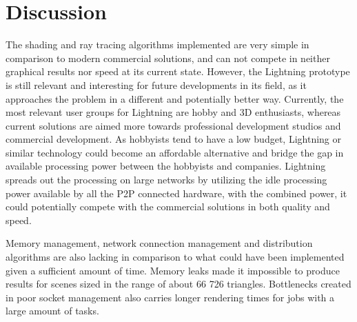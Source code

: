 \section{Discussion}



The shading and ray tracing algorithms implemented are very simple in
comparison to modern commercial solutions, and can not compete 
in neither graphical results nor speed at its current state. However, the
Lightning prototype is still relevant and interesting for 
future developments in its field, as it approaches the problem in a different
and potentially better way. Currently, the most 
relevant user groups for Lightning are hobby and 3D enthusiasts, whereas
current solutions are aimed more towards professional 
development studios and commercial development. As hobbyists tend to have a
low budget, Lightning or similar technology could become 
an affordable alternative and bridge the gap in available processing power
between the hobbyists and companies. Lightning spreads 
out the processing on large networks by utilizing the idle processing power
available by all the P2P connected hardware, with the 
combined power, it could potentially compete with the commercial solutions
in both quality and speed.

Memory management, network connection management and distribution algorithms are
also lacking in comparison to what could have been implemented given a
sufficient amount of time. Memory leaks made it
impossible to produce results for scenes sized in the range of about 66 726
triangles. Bottlenecks created in poor socket management also carries longer
rendering times for jobs with a large amount of tasks.

